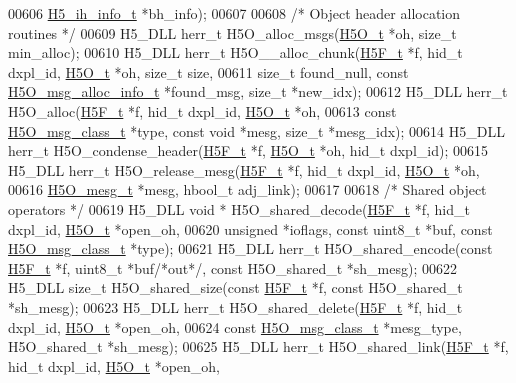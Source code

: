 \begin{DoxyCode}
00606     \hyperlink{struct_h5__ih__info__t}{H5\_ih\_info\_t} *bh\_info);
00607 
00608 \textcolor{comment}{/* Object header allocation routines */}
00609 H5\_DLL herr\_t H5O\_alloc\_msgs(\hyperlink{struct_h5_o__t}{H5O\_t} *oh, \textcolor{keywordtype}{size\_t} min\_alloc);
00610 H5\_DLL herr\_t H5O\_\_alloc\_chunk(\hyperlink{struct_h5_f__t}{H5F\_t} *f, hid\_t dxpl\_id, \hyperlink{struct_h5_o__t}{H5O\_t} *oh, \textcolor{keywordtype}{size\_t} size,
00611     \textcolor{keywordtype}{size\_t} found\_null, \textcolor{keyword}{const} \hyperlink{struct_h5_o__msg__alloc__info__t}{H5O\_msg\_alloc\_info\_t} *found\_msg, \textcolor{keywordtype}{size\_t} *new\_idx);
00612 H5\_DLL herr\_t  H5O\_alloc(\hyperlink{struct_h5_f__t}{H5F\_t} *f, hid\_t dxpl\_id, \hyperlink{struct_h5_o__t}{H5O\_t} *oh,
00613     \textcolor{keyword}{const} \hyperlink{struct_h5_o__msg__class__t}{H5O\_msg\_class\_t} *type, \textcolor{keyword}{const} \textcolor{keywordtype}{void} *mesg, \textcolor{keywordtype}{size\_t} *mesg\_idx);
00614 H5\_DLL herr\_t H5O\_condense\_header(\hyperlink{struct_h5_f__t}{H5F\_t} *f, \hyperlink{struct_h5_o__t}{H5O\_t} *oh, hid\_t dxpl\_id);
00615 H5\_DLL herr\_t H5O\_release\_mesg(\hyperlink{struct_h5_f__t}{H5F\_t} *f, hid\_t dxpl\_id, \hyperlink{struct_h5_o__t}{H5O\_t} *oh,
00616     \hyperlink{struct_h5_o__mesg__t}{H5O\_mesg\_t} *mesg, hbool\_t adj\_link);
00617 
00618 \textcolor{comment}{/* Shared object operators */}
00619 H5\_DLL \textcolor{keywordtype}{void} * H5O\_shared\_decode(\hyperlink{struct_h5_f__t}{H5F\_t} *f, hid\_t dxpl\_id, \hyperlink{struct_h5_o__t}{H5O\_t} *open\_oh,
00620     \textcolor{keywordtype}{unsigned} *ioflags, \textcolor{keyword}{const} uint8\_t *buf, \textcolor{keyword}{const} \hyperlink{struct_h5_o__msg__class__t}{H5O\_msg\_class\_t} *type);
00621 H5\_DLL herr\_t H5O\_shared\_encode(\textcolor{keyword}{const} \hyperlink{struct_h5_f__t}{H5F\_t} *f, uint8\_t *buf\textcolor{comment}{/*out*/}, \textcolor{keyword}{const} H5O\_shared\_t *sh\_mesg);
00622 H5\_DLL \textcolor{keywordtype}{size\_t} H5O\_shared\_size(\textcolor{keyword}{const} \hyperlink{struct_h5_f__t}{H5F\_t} *f, \textcolor{keyword}{const} H5O\_shared\_t *sh\_mesg);
00623 H5\_DLL herr\_t H5O\_shared\_delete(\hyperlink{struct_h5_f__t}{H5F\_t} *f, hid\_t dxpl\_id, \hyperlink{struct_h5_o__t}{H5O\_t} *open\_oh,
00624     \textcolor{keyword}{const} \hyperlink{struct_h5_o__msg__class__t}{H5O\_msg\_class\_t} *mesg\_type, H5O\_shared\_t *sh\_mesg);
00625 H5\_DLL herr\_t H5O\_shared\_link(\hyperlink{struct_h5_f__t}{H5F\_t} *f, hid\_t dxpl\_id, \hyperlink{struct_h5_o__t}{H5O\_t} *open\_oh,

\end{DoxyCode}
